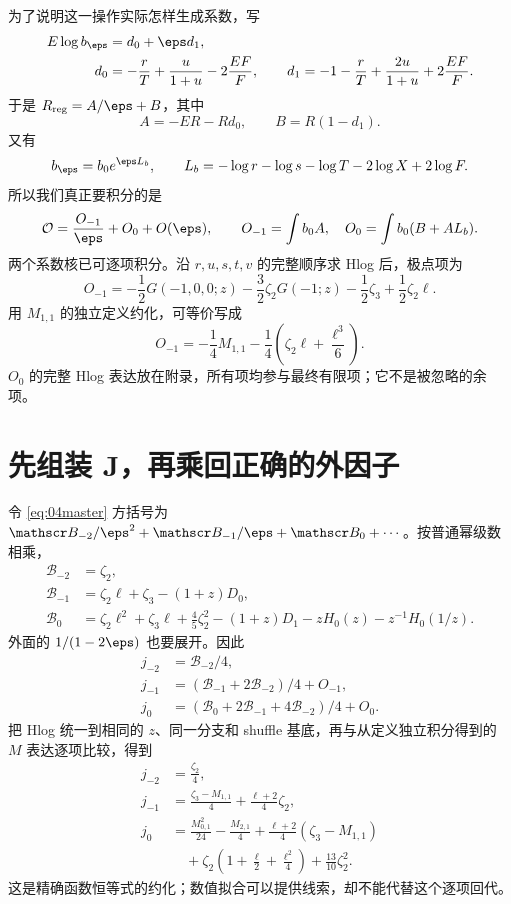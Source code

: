 为了说明这一操作实际怎样生成系数，写
\begin{align}
E\log b_\eps&=d_0+\eps d_1,\\
d_0&=-\frac rT+\frac u{1+u}-2\frac{EF}{F},\qquad
d_1=-1-\frac rT+\frac{2u}{1+u}+2\frac{EF}{F}.
\end{align}
于是 $R_{\rm reg}=A/\eps+B$，其中
\begin{equation}
A=-ER-Rd_0,\qquad B=R(1-d_1).
\end{equation}
又有
\begin{equation}
b_\eps=b_0e^{\eps L_b},\qquad
L_b=-\log r-\log s-\log T-2\log X+2\log F.
\end{equation}
所以我们真正要积分的是
\begin{equation}
\mathcal O=\frac{O_{-1}}\eps+O_0+O(\eps),\qquad
O_{-1}=\int b_0A,\quad O_0=\int b_0(B+AL_b).
\label{eq:Ocoeff}
\end{equation}
两个系数核已可逐项积分。沿 $r,u,s,t,v$ 的完整顺序求 Hlog 后，极点项为
\begin{equation}
O_{-1}=-\frac12G(-1,0,0;z)-\frac32\zeta_2G(-1;z)
-\frac12\zeta_3+\frac12\zeta_2\ell.
\end{equation}
用 $M_{1,1}$ 的独立定义约化，可等价写成
\begin{equation}
O_{-1}=-\frac14M_{1,1}-\frac14\left(\zeta_2\ell+\frac{\ell^3}{6}\right).
\label{eq:Om1}
\end{equation}
$O_0$ 的完整 Hlog 表达放在附录，所有项均参与最终有限项；它不是被忽略的余项。

\section{先组装 J，再乘回正确的外因子}
令 \eqref{eq:04master} 方括号为
$\mathscr B_{-2}/\eps^2+\mathscr B_{-1}/\eps+\mathscr B_0+\cdots$。按普通幂级数相乘，
\begin{align}
\mathscr B_{-2}&=\zeta_2,\\
\mathscr B_{-1}&=\zeta_2\ell+\zeta_3-(1+z)D_0,\\
\mathscr B_0&=\zeta_2\ell^2+\zeta_3\ell+\frac45\zeta_2^2
-(1+z)D_1-zH_0(z)-z^{-1}H_0(1/z).
\end{align}
外面的 $1/(1-2\eps)$ 也要展开。因此
\begin{align}
j_{-2}&=\mathscr B_{-2}/4,\\
j_{-1}&=(\mathscr B_{-1}+2\mathscr B_{-2})/4+O_{-1},\\
j_0&=(\mathscr B_0+2\mathscr B_{-1}+4\mathscr B_{-2})/4+O_0.
\label{eq:j04assembly}
\end{align}
把 Hlog 统一到相同的 $z$、同一分支和 shuffle 基底，再与从定义独立积分得到的 $M$ 表达逐项比较，得到
\begin{align}
j_{-2}&=\frac{\zeta_2}{4},\\
j_{-1}&=\frac{\zeta_3-M_{1,1}}4+\frac{\ell+2}{4}\zeta_2,\\
j_0&=\frac{M_{0,1}^2}{24}-\frac{M_{2,1}}4
+\frac{\ell+2}{4}(\zeta_3-M_{1,1})\nonumber\\
&\hspace{1em}+\zeta_2\left(1+\frac\ell2+\frac{\ell^2}4\right)+\frac{13}{10}\zeta_2^2.
\label{eq:j04M}
\end{align}
这是精确函数恒等式的约化；数值拟合可以提供线索，却不能代替这个逐项回代。

